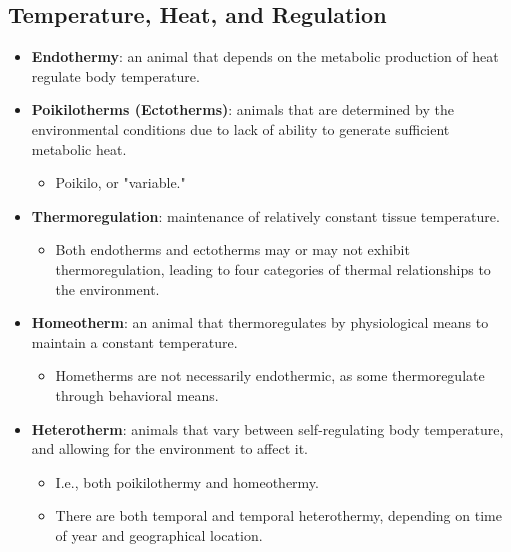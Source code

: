 \documentclass[12pt,a4paper]{article}
\begin{document}
\subsection{Temperature, Heat, and Regulation}
\begin{itemize}
    \item \textbf{Endothermy}: an animal that depends on the {\color{o-Sun}metabolic} production of heat regulate body temperature.
    \item \textbf{Poikilotherms (Ectotherms)}: animals that are determined by the environmental conditions due to lack of ability to generate sufficient metabolic heat.
        \begin{itemize}
            \item Poikilo, or "variable."
        \end{itemize}
    \item \textbf{Thermoregulation}: maintenance of relatively constant tissue temperature.
        \begin{itemize}
            \item Both endotherms and ectotherms may or may not exhibit thermoregulation, leading to four categories of thermal relationships to the environment.
        \end{itemize}
    \item \textbf{Homeotherm}: an animal that thermoregulates by physiological means to maintain a constant temperature.
        \begin{itemize}
            \item Hometherms are not necessarily endothermic, as some thermoregulate through {\color{o-Sun}behavioral} means.
        \end{itemize}
    \item \textbf{Heterotherm}: animals that vary between self-regulating body temperature, and allowing for the environment to affect it.
        \begin{itemize}
            \item I.e., both poikilothermy and homeothermy.
            \item There are both temporal and temporal heterothermy, depending on time of year and geographical location.
        \end{itemize}
\end{itemize}
\end{document}
